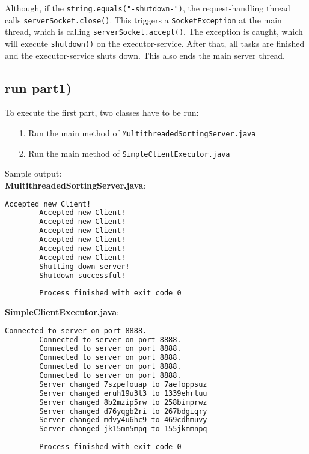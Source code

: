 \documentclass{article}
\begin{document}
    Although, if the \texttt{string.equals("-shutdown-")}, the request-handling thread calls \texttt{serverSocket.close()}. This triggers a \texttt{SocketException} at the main thread, which is calling \texttt{serverSocket.accept()}. The exception is caught, which will execute \texttt{shutdown()} on the executor-service. After that, all tasks are finished and the executor-service shuts down. This also ends the main server thread.\\
    
    \subsection*{run part1)}
    
      To execute the first part, two classes have to be run:
      \begin{itemize}
    	\item[1.] Run the main method of \texttt{MultithreadedSortingServer.java}
    	\item[2.] Run the main method of \texttt{SimpleClientExecutor.java}
      \end{itemize}
      Sample output:\\
      \textbf{MultithreadedSortingServer.java}:\\
      \begin{lstlisting}[language=sh]
        Accepted new Client!
        Accepted new Client!
        Accepted new Client!
        Accepted new Client!
        Accepted new Client!
        Accepted new Client!
        Accepted new Client!
        Shutting down server!
        Shutdown successful!
      
        Process finished with exit code 0
      \end{lstlisting}
      \textbf{SimpleClientExecutor.java}:\\
      \begin{lstlisting}[language=sh]
        Connected to server on port 8888.
        Connected to server on port 8888.
        Connected to server on port 8888.
        Connected to server on port 8888.
        Connected to server on port 8888.
        Connected to server on port 8888.
        Server changed 7szpefouap to 7aefoppsuz
        Server changed eruh19u3t3 to 1339ehrtuu
        Server changed 8b2mzip5rw to 258bimprwz
        Server changed d76yqgb2ri to 267bdgiqry
        Server changed mdvy4u6hc9 to 469cdhmuvy
        Server changed jk15mn5mpq to 155jkmmnpq
      
        Process finished with exit code 0
      \end{lstlisting}      
	
\end{document}
